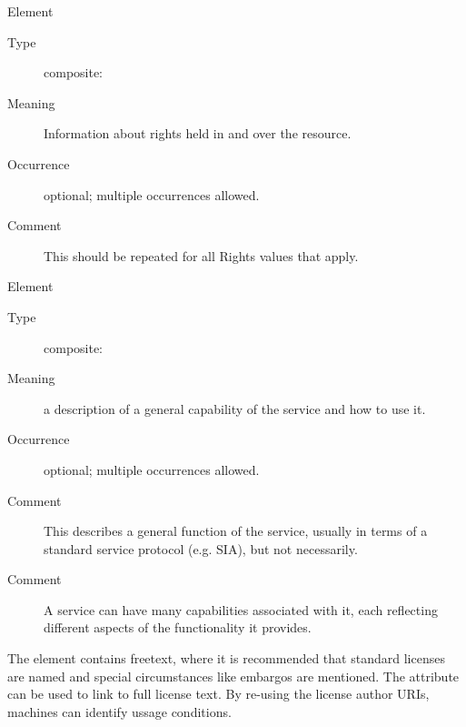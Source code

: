 \documentclass[11pt,a4paper]{ivoa}
\begin{document}
\begingroup\small\begin{bigdescription}\item[Element \xmlel{rights}]
\begin{description}
\item[Type] composite: 
\item[Meaning] 
                       Information about rights held in and over the resource.
                     
\item[Occurrence] optional; multiple occurrences allowed.
\item[Comment] 
                       This should be repeated for all Rights values that apply.
                     

\end{description}
\item[Element \xmlel{capability}]
\begin{description}
\item[Type] composite: 
\item[Meaning] 
                        a description of a general capability of the
                        service and how to use it.
                     
\item[Occurrence] optional; multiple occurrences allowed.
\item[Comment] 
                        This describes a general function of the
                        service, usually in terms of a standard
                        service protocol (e.g. SIA), but not
                        necessarily.  
                     
\item[Comment] 
                        A service can have many capabilities
                        associated with it, each reflecting different
                        aspects of the functionality it provides.  
                     

\end{description}


\end{bigdescription}\endgroup

\endgroup

The  element contains freetext, where it is recommended
that standard licenses are named and special circumstances like embargos
are mentioned.  The  attribute can be used to link to
full license text.  By re-using the license author URIs, machines can
identify ussage conditions.
\end{document}

